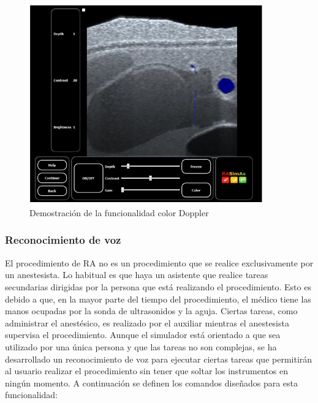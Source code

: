 \begin{figure}[h]
    \centering
    \includegraphics[width=0.9\textwidth]{IMG/uscolor.PNG}
    \caption{Demostración de la funcionalidad color Doppler}
    \label{fig:doppler}
\end{figure}
 
\subsubsection{Reconocimiento de voz}

El procedimiento de \ac{RA} no es un procedimiento que se realice exclusivamente por un anestesista. Lo habitual es que haya un asistente que  realice tareas secundarias dirigidas por la persona que está realizando el procedimiento. Esto es debido a que, en la mayor parte del tiempo del procedimiento, el médico tiene las manos ocupadas por la sonda de ultrasonidos y la aguja. Ciertas tareas, como administrar el anestésico, es realizado por el auxiliar mientras el anestesista supervisa el procedimiento. Aunque el simulador está orientado a que sea utilizado por una única persona y que las tareas no son complejas, se ha desarrollado un reconocimiento de voz para ejecutar ciertas tareas que permitirán al usuario realizar el procedimiento sin tener que soltar los instrumentos en ningún momento. A continuación se definen los comandos diseñados para esta funcionalidad:

